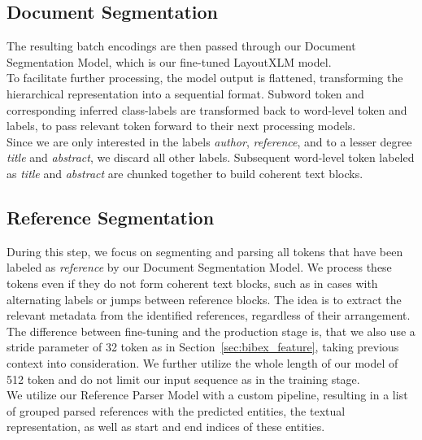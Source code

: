 \subsection{Document Segmentation}\label{sec:bibex_doc_seg}
The resulting batch encodings are then passed through our Document Segmentation Model, which is our fine-tuned LayoutXLM model.\\
To facilitate further processing, the model output is flattened, transforming the hierarchical representation into a sequential format. Subword token and corresponding inferred class-labels are transformed back to word-level token and labels, to pass relevant token forward to their next processing models.\\
Since we are only interested in the labels \textit{author}, \textit{reference}, and to a lesser degree \textit{title} and \textit{abstract}, we discard all other labels. Subsequent word-level token labeled as \textit{title} and \textit{abstract} are chunked together to build coherent text blocks.

\subsection{Reference Segmentation}
During this step, we focus on segmenting and parsing all tokens that have been labeled as \textit{reference} by our Document Segmentation Model. We process these tokens even if they do not form coherent text blocks, such as in cases with alternating labels or jumps between reference blocks. The idea is to extract the relevant metadata from the identified references, regardless of their arrangement.\\
The difference between fine-tuning and the production stage is, that we also use a stride parameter of 32 token as in Section~\ref{sec:bibex_feature}, taking previous context into consideration. We further utilize the whole length of our model of 512 token and do not limit our input sequence as in the training stage.\\
We utilize our Reference Parser Model with a custom pipeline, resulting in a list of grouped parsed references with the predicted entities, the textual representation, as well as start and end indices of these entities.

